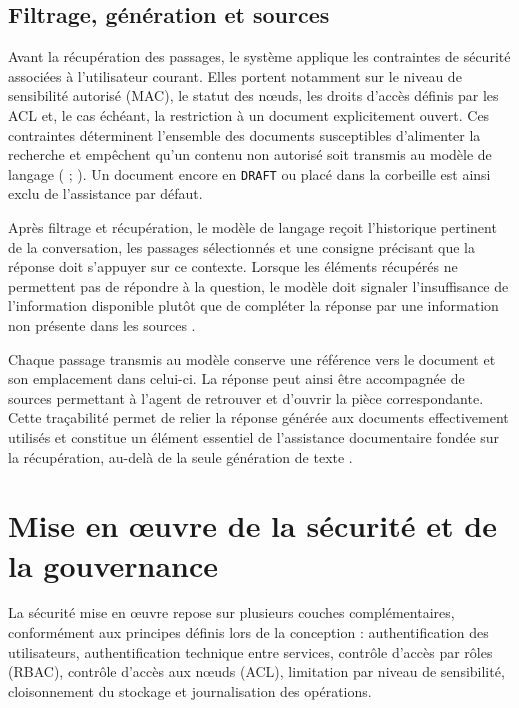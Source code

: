 \subsection{Filtrage, génération et sources}

Avant la récupération des passages, le système applique les contraintes de sécurité associées à l'utilisateur courant. Elles portent notamment sur le niveau de sensibilité autorisé (MAC), le statut des nœuds, les droits d'accès définis par les ACL et, le cas échéant, la restriction à un document explicitement ouvert. Ces contraintes déterminent l'ensemble des documents susceptibles d'alimenter la recherche et empêchent qu'un contenu non autorisé soit transmis au modèle de langage ( ; ). Un document encore en \texttt{DRAFT} ou placé dans la corbeille est ainsi exclu de l'assistance par défaut.

Après filtrage et récupération, le modèle de langage reçoit l'historique pertinent de la conversation, les passages sélectionnés et une consigne précisant que la réponse doit s'appuyer sur ce contexte. Lorsque les éléments récupérés ne permettent pas de répondre à la question, le modèle doit signaler l'insuffisance de l'information disponible plutôt que de compléter la réponse par une information non présente dans les sources .

Chaque passage transmis au modèle conserve une référence vers le document et son emplacement dans celui-ci. La réponse peut ainsi être accompagnée de sources permettant à l'agent de retrouver et d'ouvrir la pièce correspondante. Cette traçabilité permet de relier la réponse générée aux documents effectivement utilisés et constitue un élément essentiel de l'assistance documentaire fondée sur la récupération, au-delà de la seule génération de texte .

\section{Mise en œuvre de la sécurité et de la gouvernance}

La sécurité mise en œuvre repose sur plusieurs couches complémentaires, conformément aux principes définis lors de la conception : authentification des utilisateurs, authentification technique entre services, contrôle d'accès par rôles (RBAC), contrôle d'accès aux nœuds (ACL), limitation par niveau de sensibilité, cloisonnement du stockage et journalisation des opérations.

